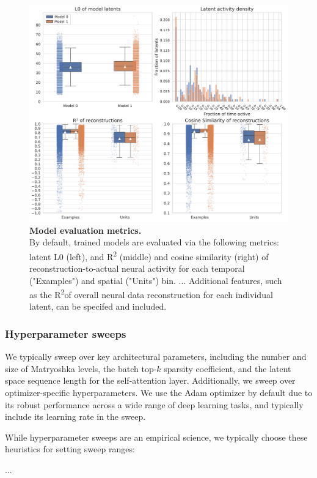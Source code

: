 \begin{figure}[h]
    \centering
    \includegraphics[width=\linewidth]{figures/model_eval.pdf}
    \caption{
        \textbf{Model evaluation metrics.} \\
        \small By default, trained models are evaluated via the following metrics: latent L0 (left), and R\textsuperscript{2} (middle) and cosine similarity (right) of reconstruction-to-actual neural activity for each temporal ("Examples") and spatial ("Units") bin. ... Additional features, such as the R\textsuperscript{2}of overall neural data reconstruction for each individual latent, can be specifed and included.
    }
    \label{figure:model_eval}
\end{figure}

\subsubsection{Hyperparameter sweeps}
\label{subsubsection:hyperparameter_sweeps}

 We typically sweep over key architectural parameters, including the number and size of Matryoshka levels, the batch top-$k$ sparsity coefficient, and the latent space sequence length for the self-attention layer. Additionally, we sweep over optimizer-specific hyperparameters. We use the Adam optimizer by default due to its robust performance across a wide range of deep learning tasks, and typically include its learning rate in the sweep.

 While hyperparameter sweeps are an empirical science, we typically choose these heuristics for setting sweep ranges:

 ...
